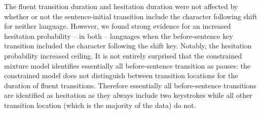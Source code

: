 \begin{appendix}
The fluent transition duration and hesitation duration were not affected
by whether or not the sentence-initial transition include the character
following shift for neither language. However, we found strong evidence
for an increased hesitation probability -- in both -- languages when the
before-sentence key transition included the character following the
shift key. Notably, the hesitation probability increased ceiling. It is
not entirely surprised that the constrained mixture model identifies
essentially all before-sentence transition as pauses: the constrained
model does not distinguish between transition locations for the duration
of fluent transitions. Therefore essentially all before-sentence
transitions are identified as hesitation as they always include two
keystrokes while all other transition location (which is the majority of
the data) do not.
\end{appendix}
